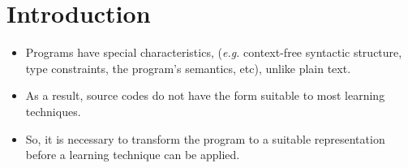 \section{Introduction}\label{sec:intro}
\begin{frame}{}
\justifying
\begin{itemize}
    \item Programs have special characteristics, (\textit{e.g.} context-free syntactic structure, type constraints, the program’s semantics, etc), unlike plain text.
    \item As a result, source codes do not have the form suitable to most learning techniques.
    \item So, it is necessary to transform the program to a suitable representation before a learning technique can be applied.
\end{itemize}
\end{frame}